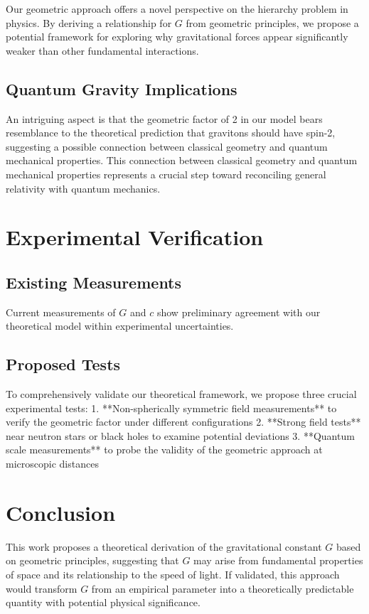 \documentclass[12pt,twocolumn]{article}
\begin{document}
Our geometric approach offers a novel perspective on the hierarchy problem in physics. By deriving a relationship for $G$ from geometric principles, we propose a potential framework for exploring why gravitational forces appear significantly weaker than other fundamental interactions.

\subsection{Quantum Gravity Implications}

An intriguing aspect is that the geometric factor of 2 in our model bears resemblance to the theoretical prediction that gravitons should have spin-2, suggesting a possible connection between classical geometry and quantum mechanical properties. This connection between classical geometry and quantum mechanical properties represents a crucial step toward reconciling general relativity with quantum mechanics.

\section*{Experimental Verification}

\subsection{Existing Measurements}

Current measurements of $G$ and $c$ show preliminary agreement with our theoretical model within experimental uncertainties.

\subsection{Proposed Tests}

To comprehensively validate our theoretical framework, we propose three crucial experimental tests:
1. **Non-spherically symmetric field measurements** to verify the geometric factor under different configurations
2. **Strong field tests** near neutron stars or black holes to examine potential deviations
3. **Quantum scale measurements** to probe the validity of the geometric approach at microscopic distances

\section*{Conclusion}

This work proposes a theoretical derivation of the gravitational constant $G$ based on geometric principles, suggesting that $G$ may arise from fundamental properties of space and its relationship to the speed of light. If validated, this approach would transform $G$ from an empirical parameter into a theoretically predictable quantity with potential physical significance.
\end{document}
